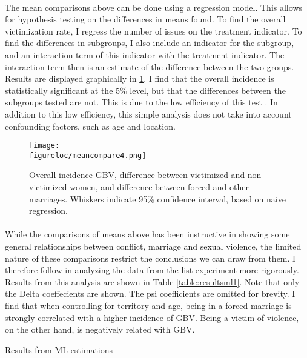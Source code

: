 \documentclass[11pt,a4paper]{scrartcl} %
\newcommand{\figureloc}{C:/Users/Koen/Dropbox/PhD/Papers/CongoGBV/Figures}
\newcommand{\tableloc}{C:/Users/Koen/Dropbox/PhD/Papers/CongoGBV/Tables}
\begin{document}
\paragraph{}
The mean comparisons above can be done using a regression model. This allows for hypothesis testing on the differences in means found. To find the overall victimization rate, I regress the number of issues on the treatment indicator. To find the differences in subgroups, I also include an indicator for the subgroup, and an interaction term of this indicator with the treatment indicator. The interaction term then is an estimate of the difference between the two groups. Results are displayed graphically in \ref{fig:meancompare4}. I find that the overall incidence is statistically significant at the 5\% level, but that the differences between the subgroups tested are not. This is due to the low efficiency of this test \cite{Imai2011}. In addition to this low efficiency, this simple analysis does not take into account confounding factors, such as age and location.

\begin{figure}
  \texttt{[image: \\figureloc/meancompare4.png]}
  \caption{Overall incidence GBV, difference between victimized and non-victimized women, and difference between forced and other marriages. Whiskers indicate 95\% confidence interval, based on naive regression.}
  \label{fig:meancompare4}
\end{figure}


\paragraph{}
While the comparisons of means above has been instructive in showing some general relationships between conflict, marriage and sexual violence, the limited nature of these comparisons restrict the conclusions we can draw from them. I therefore follow \cite{Imai2011} in analyzing the data from the list experiment more rigorously. Results from this analysis are shown in Table \ref{table:resultsml1}. Note that only the Delta coeffecients are shown. The psi coefficients are omitted for brevity. I find that when controlling for territory and age, being in a forced marriage is strongly correlated with a higher incidence of GBV. Being a victim of violence, on the other hand, is negatively related with GBV.

\begin{table}
	\caption{Results from ML estimations}\label{table:resultsml1}
	\begin{center}
	
	\end{center}
\end{table}
\end{document}
